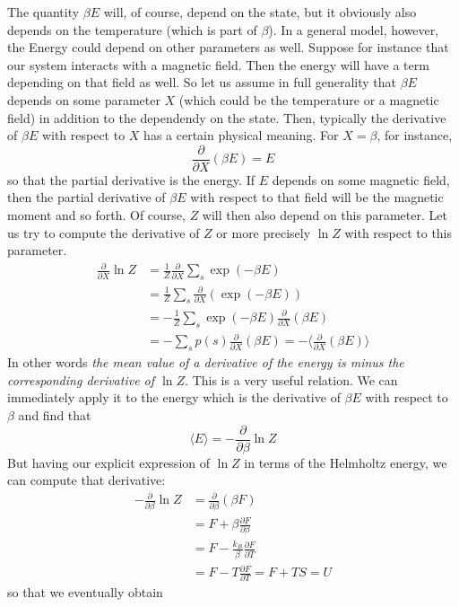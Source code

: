 \documentclass[a4paper, draft]{article}
\theoremstyle{own}
\theoremstyle{remark}
\begin{document}
The quantity $\beta E$ will, of course, depend on the state, but it obviously also depends on the temperature (which is part of $\beta$). In a general model, however, the Energy could depend on other parameters as well. Suppose for instance that our system interacts with a magnetic field. Then the energy will have a term depending on that field as well. So let us assume in full generality that  $\beta E$ depends on some parameter $X$ (which could be the temperature or a magnetic field) in addition to the dependendy on the state. Then, typically the derivative of $\beta E$ with respect to $X$ has a certain physical meaning. For $X = \beta$, for instance,
$$
\frac{\partial}{\partial X} (\beta E) = E
$$
so that the partial derivative is the energy. If $E$ depends on some magnetic field, then the partial derivative of $\beta E$ with respect to that field will be the magnetic moment and so forth. Of course, $Z$ will then also depend on this parameter. Let us try to compute the derivative of $Z$ or more precisely $\ln Z$ with respect to this parameter.
\begin{align*}
\frac{\partial}{\partial X}  \ln Z &= \frac{1}{Z} \frac{\partial}{\partial X} \sum_s \exp(- \beta E) \\
&= \frac{1}{Z} \sum_s \frac{\partial}{\partial X}  (\exp(- \beta E))  \\
&= - \frac{1}{Z} \sum_s \exp(- \beta E) \frac{\partial}{\partial X} (\beta E) \\
&= - \sum_s p(s) \frac{\partial}{\partial X} (\beta E) = - \langle \frac{\partial}{\partial X} (\beta E) \rangle 
\end{align*}
In other words {\em the mean value of a derivative of the energy is minus the corresponding derivative of $\ln Z$}. This is a very useful relation. We can immediately apply it to the energy which is the derivative of $\beta E$ with respect to $\beta$ and find that
$$
\langle E \rangle = - \frac{\partial }{\partial \beta} \ln Z
$$
But having our explicit expression of $\ln Z$ in terms of the Helmholtz energy, we can compute that derivative:
\begin{align*}
- \frac{\partial }{\partial \beta} \ln Z 
&=  \frac{\partial }{\partial \beta} (\beta F) \\
&= F + \beta \frac{\partial F}{\partial \beta} \\
&= F - \frac{k_B}{\beta} \frac{\partial F}{\partial T} \\
&= F - T \frac{\partial F}{\partial T} = F + TS = U 
\end{align*}
so that we eventually obtain
\end{document}
